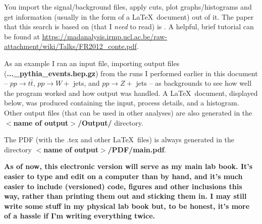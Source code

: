 You import the signal/background files, apply cuts, plot graphs/histograms and get information (usually in the form of a \LaTeX\ document) out of it. The paper that this search is based on (that I \emph{need} to read) is \cite{ATLAS-CONF-2016-019}. A helpful, brief tutorial can be found at \url{https://madanalysis.irmp.ucl.ac.be/raw-attachment/wiki/Talks/FR2012_conte.pdf}.

As an example I ran an input file, importing \madgraph output files (\textbf{...\_pythia\_events.hep.gz}) from the runs I performed earlier in this document -- $pp \rightarrow t\bar{t}$, $pp \rightarrow W +$ jets, and $pp \rightarrow Z +$ jets -- as backgrounds to see how well the program worked and how output was handled. A \LaTeX\ document, displayed below, was produced containing the input, process details, and a histogram. Other output files (that can be used in other analyses) are also generated in the \textbf{$<$name of output$>$/Output/} directory.

The PDF (with the .tex and other \LaTeX\ files) is always generated in the directory \textbf{$<$name of output$>$/PDF/main.pdf}.

\textbf{As of now, this electronic version will serve as my main lab book. It's easier to type and edit on a computer than by hand, and it's much easier to include (versioned) code, figures and other inclusions this way, rather than printing them out and sticking them in. I may still write some stuff in my physical lab book but, to be honest, it's more of a hassle if I'm writing everything twice.}
